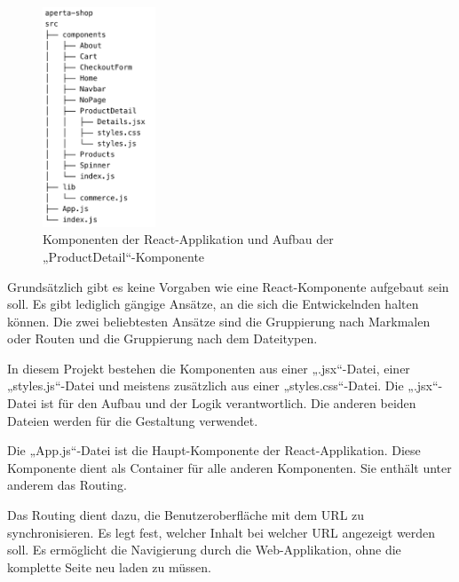 \begin{figure}[H]
  \centering
  \includegraphics[width=0.3\textwidth]{pics/react-komponentenstruktur.png}
  \caption{Komponenten der React-Applikation und Aufbau der „ProductDetail“-Komponente}
\end{figure}

Grundsätzlich gibt es keine Vorgaben wie eine React-Komponente aufgebaut sein soll. Es gibt lediglich gängige Ansätze, an die sich die Entwickelnden halten können. Die zwei beliebtesten Ansätze sind die Gruppierung nach Markmalen oder Routen und die Gruppierung nach dem Dateitypen.
\cite{reactComponents}

In diesem Projekt bestehen die Komponenten aus einer „.jsx“-Datei, einer „styles.js“-Datei und meistens zusätzlich aus einer „styles.css“-Datei. Die „.jsx“-Datei ist für den Aufbau und der Logik verantwortlich. Die anderen beiden Dateien werden für die Gestaltung verwendet.

Die „App.js“-Datei ist die Haupt-Komponente der React-Applikation. Diese Komponente dient als Container für alle anderen Komponenten. Sie enthält unter anderem das Routing.
\cite{appJS}

Das Routing dient dazu, die Benutzeroberfläche mit dem URL zu synchronisieren. Es legt fest, welcher Inhalt bei welcher URL angezeigt werden soll. Es ermöglicht die Navigierung durch die Web-Applikation, ohne die komplette Seite neu laden zu müssen.
\cite{reactRouting}

